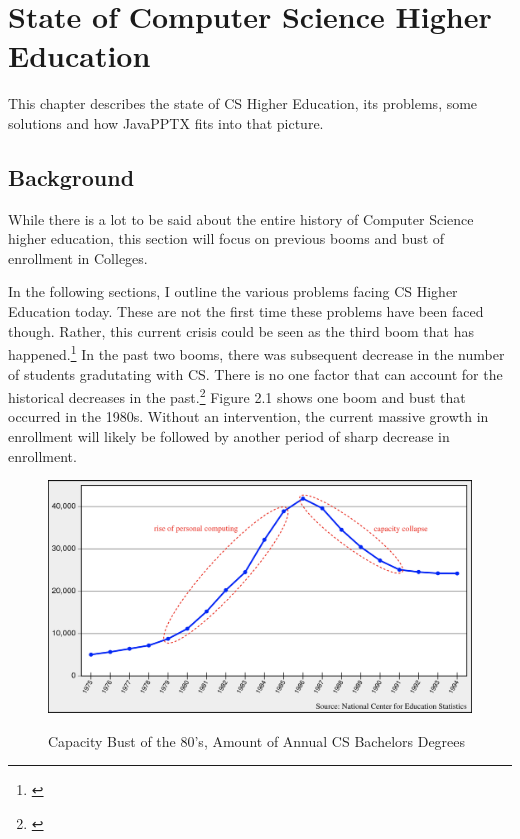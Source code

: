 \documentclass[12pt,twoside]{reedthesis}
\begin{document}
\chapter{State of Computer Science Higher Education}	
This chapter describes the state of CS Higher Education, its problems, some solutions and how JavaPPTX fits into that picture.

\section{Background}
While there is a lot to be said about the entire history of Computer Science higher education, this section will focus on previous booms and bust of enrollment in Colleges. 

In the following sections, I outline the various problems facing CS Higher Education today. These are not the first time these problems have been faced though. Rather, this current crisis could be seen as the third boom that has happened.\footnote{\cite{roberts_history}} In the past two booms, there was subsequent decrease in the number of students gradutating with CS. There is no one factor that can account for the historical decreases in the past.\footnote{\cite{committee_on_the_growth_of_computer_science_undergraduate_enrollments_assessing_2018}}  Figure 2.1 shows one boom and bust that occurred in the 1980s. Without an intervention, the current massive growth in enrollment will likely be followed by another period of sharp decrease in enrollment. 
\begin{figure}[htbp] 
\begin{centering} 
\caption{Capacity Bust of the 80's, Amount of Annual CS Bachelors Degrees}
\includegraphics[scale=0.345] {computerbust}
\label{animexample}
\end{centering} 
\end{figure}
\end{document}
